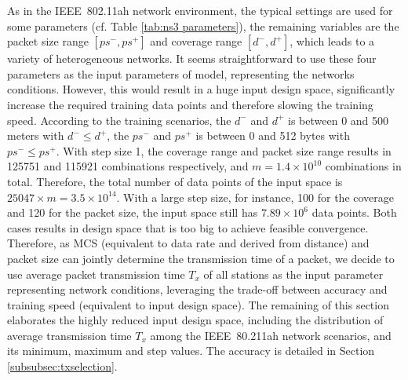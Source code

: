 As in the IEEE~802.11ah network environment, the typical settings are used for  some parameters (cf. Table \ref{tab:ns3 parameters}), the remaining variables are the  packet size  range $[ps^-, ps^+]$ and coverage range $[d^-, d^+]$, which leads to a variety of heterogeneous networks. It seems straightforward to use these four parameters as the input parameters of model, representing the networks conditions. However, this would result in a huge input design space, significantly increase the required training data points and therefore slowing the training speed. According to the training scenarios, the $d^-$ and $d^+$ is between 0 and 500 meters with $d^- \leq d^+$, the $ps^-$ and $ps^+$ is between 0 and 512 bytes with $ps^- \leq ps^+$. With step size 1, the coverage range and packet size range  results in 125751 and 115921 combinations respectively, and $m = 1.4 \times 10^{10} $ combinations in total. Therefore, the total number of data points of the input space is $25047 \times m = 3.5 \times  10^{14}$. With a large step size, for instance, 100 for  the coverage and 120 for the packet size, the input space still has $7.89 \times  10^{6}$ data points. Both cases results in design space that is too big to achieve feasible convergence. Therefore, as MCS (equivalent to data rate and derived from distance) and packet size can jointly determine the transmission time of a packet, we decide to use average packet transmission time $T_x$ of all stations as the input parameter representing network conditions, leveraging the trade-off between accuracy and training speed (equivalent to input design space). The remaining of this section elaborates the highly reduced input design space, including the distribution of average transmission time $T_x$ among the IEEE~80.211ah network scenarios, and its minimum,  maximum and step values. The accuracy is detailed in Section \ref{subsubsec:txselection}.


